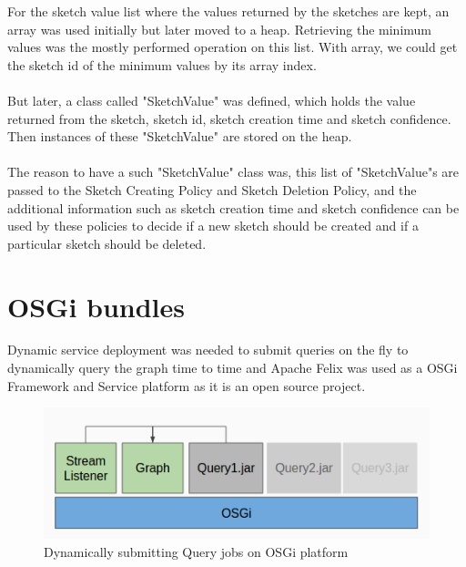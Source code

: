 \documentclass[12pt]{report}
\numberwithin{figure}{section}
\numberwithin{table}{section}
\begin{document}
For the sketch value list where the values returned by the sketches are kept, an array was used initially but later moved to a heap. Retrieving the minimum values was the mostly performed operation on this list.  With array, we could get the sketch id of the minimum values by its array index. 

\paragraph{}

But later, a class called "SketchValue" was defined, which holds the value returned from the sketch, sketch id, sketch creation time and sketch confidence. Then instances of these "SketchValue" are stored on the heap. 

\paragraph{}

The reason to have a such "SketchValue" class was, this list of "SketchValue"s are passed to the Sketch Creating Policy and Sketch Deletion Policy, and the additional information such as sketch creation time and sketch confidence can be used by these policies to decide if a new sketch should be created and if a particular sketch should be deleted.
 
\section{OSGi bundles}

Dynamic service deployment was needed to submit queries on the fly to dynamically query the graph time to time and Apache Felix was used as a OSGi Framework and Service platform as it is an open source project. 

\begin{figure}[H]
\centering
\includegraphics[scale=0.6]{images/OSGi}
\caption{Dynamically submitting Query jobs on OSGi platform}
\end{figure}
\end{document}
